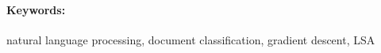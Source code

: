 \documentclass[12pt, oneside]{book}
\theoremstyle{definition}
\begin{document}
\paragraph*{Keywords:} natural language processing, document classification, gradient descent, LSA




%
%



\newpage 

\tableofcontents




\listoffigures


\listoftables


\mainmatter

 


\newpage	

{
    \backmatter
    
    \thispagestyle{empty}
    \nocite{*}
    \clearpage
    
    
     
}

\appendix


\end{document}

